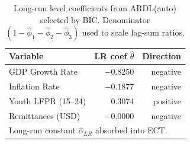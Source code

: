 \begin{table}[h]
\caption{Long-run level coefficients from ARDL(auto) selected by BIC. Denominator
  $(1-\hat\phi_1-\hat\phi_2-\hat\phi_3)$ used to scale lag-sum ratios.}
\label{tab:ardl_longrun}
\footnotesize
\begin{tabular}{lrr}
\toprule
\textbf{Variable} & \textbf{LR coef $\hat\theta$} & \textbf{Direction} \\
\midrule
  GDP Growth Rate & $-0.8250$ & negative \\ 
  Inflation Rate & $-0.1877$ & negative \\ 
  Youth LFPR (15--24) & $0.3074$ & positive \\ 
  Remittances (USD) & $-0.0000$ & negative \\ 
\bottomrule
\multicolumn{3}{l}{\scriptsize Long-run constant $\hat\alpha_{LR}$ absorbed into ECT.} \\
\end{tabular}
\end{table}